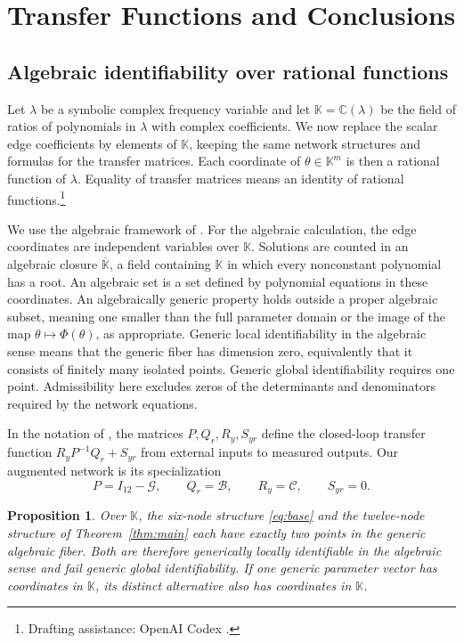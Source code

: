\documentclass[letterpaper,10pt,conference]{ieeeconf}
\newtheorem{proposition}{Proposition}
\newcommand{\aicite}{\footnote{Drafting assistance: OpenAI Codex \cite{codex}.}\space}
\begin{document}
\section{Transfer Functions and Conclusions}
\label{sec:conclusion}

\subsection{Algebraic identifiability over rational functions}

Let \(\lambda\) be a symbolic complex frequency variable and let
\(\mathbb K=\mathbb C(\lambda)\) be the field of ratios of polynomials
in \(\lambda\) with complex coefficients. We now replace the scalar
edge coefficients by elements of \(\mathbb K\), keeping the same
network structures and formulas for the transfer matrices. Each coordinate of
\(\theta\in\mathbb K^m\) is then a rational function of \(\lambda\).
Equality of transfer matrices means an identity of rational functions.\aicite

We use the algebraic framework of \cite[Sec.~V]{HMA26}.
For the algebraic calculation, the edge coordinates are independent
variables over \(\mathbb K\). Solutions are counted in an algebraic
closure \(\overline{\mathbb K}\), a field containing \(\mathbb K\)
in which every nonconstant polynomial has a root. An algebraic set is
a set defined by polynomial equations in these coordinates.
An algebraically generic property holds outside a proper algebraic
subset, meaning one smaller than the full parameter domain or the
image of the map \(\theta\mapsto\Phi(\theta)\), as appropriate.
Generic local identifiability in the algebraic sense means that the
generic fiber has dimension zero, equivalently that it consists of
finitely many isolated points. Generic global identifiability requires
one point. Admissibility here excludes zeros of the determinants and
denominators required by the network equations.

\balance
In the notation of \cite{HMA26}, the matrices \(P,Q_r,R_y,S_{yr}\)
define the closed-loop transfer function \(R_yP^{-1}Q_r+S_{yr}\)
from external inputs to measured outputs.
Our augmented network is its specialization
\[
 P=I_{12}-\mathcal G,\qquad Q_r=\mathcal B,\qquad
 R_y=\mathcal C,\qquad S_{yr}=0.
\]

\begin{proposition}\label{prop:field}
Over \(\mathbb K\), the six-node structure \eqref{eq:base} and the
twelve-node structure of Theorem~\ref{thm:main} each have exactly
two points in the generic algebraic fiber. Both are therefore
generically locally identifiable in the algebraic sense and fail
generic global identifiability. If one generic parameter vector has
coordinates in \(\mathbb K\), its distinct alternative also has
coordinates in \(\mathbb K\).
\end{proposition}
\end{document}
